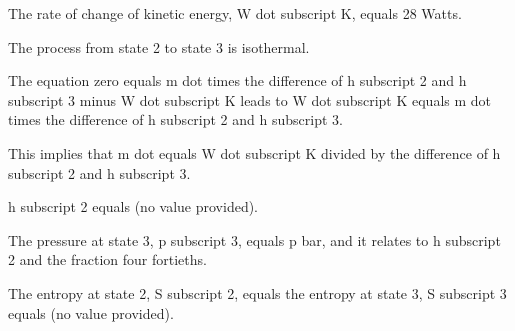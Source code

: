 The rate of change of kinetic energy, W dot subscript K, equals 28 Watts.

The process from state 2 to state 3 is isothermal.

The equation zero equals m dot times the difference of h subscript 2 and h subscript 3 minus W dot subscript K leads to W dot subscript K equals m dot times the difference of h subscript 2 and h subscript 3.

This implies that m dot equals W dot subscript K divided by the difference of h subscript 2 and h subscript 3.

h subscript 2 equals (no value provided).

The pressure at state 3, p subscript 3, equals p bar, and it relates to h subscript 2 and the fraction four fortieths.

The entropy at state 2, S subscript 2, equals the entropy at state 3, S subscript 3 equals (no value provided).
